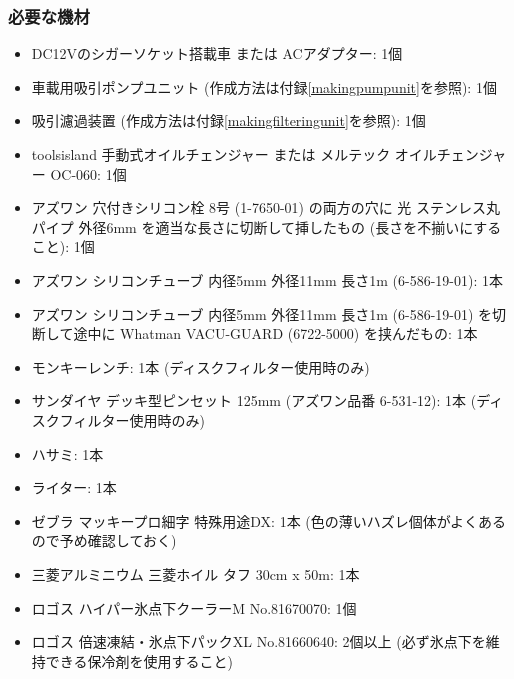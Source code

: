 \documentclass[titlepage,10pt,a4paper,uplatex]{jsbook}
\begin{document}
\subsubsection{必要な機材}
\begin{itemize}
\item DC12Vのシガーソケット搭載車 または ACアダプター: 1個
\item 車載用吸引ポンプユニット (作成方法は付録\ref{makingpumpunit}を参照): 1個
\item 吸引濾過装置 (作成方法は付録\ref{makingfilteringunit}を参照): 1個
\item toolsisland 手動式オイルチェンジャー または メルテック オイルチェンジャー OC-060: 1個
\item アズワン 穴付きシリコン栓 8号 (1-7650-01) の両方の穴に 光 ステンレス丸パイプ 外径6mm を適当な長さに切断して挿したもの (長さを不揃いにすること): 1個
\item アズワン シリコンチューブ 内径5mm 外径11mm 長さ1m (6-586-19-01): 1本
\item アズワン シリコンチューブ 内径5mm 外径11mm 長さ1m (6-586-19-01) を切断して途中に Whatman VACU-GUARD (6722-5000) を挟んだもの: 1本
\item モンキーレンチ: 1本 (ディスクフィルター使用時のみ)
\item サンダイヤ デッキ型ピンセット 125mm (アズワン品番 6-531-12): 1本 (ディスクフィルター使用時のみ)
\item ハサミ: 1本
\item ライター: 1本
\item ゼブラ マッキープロ細字 特殊用途DX: 1本 (色の薄いハズレ個体がよくあるので予め確認しておく)
\item 三菱アルミニウム 三菱ホイル タフ 30cm x 50m: 1本
\item ロゴス ハイパー氷点下クーラーM No.81670070: 1個
\item ロゴス 倍速凍結・氷点下パックXL No.81660640: 2個以上 (必ず氷点下を維持できる保冷剤を使用すること)
\end{itemize}
\end{document}
